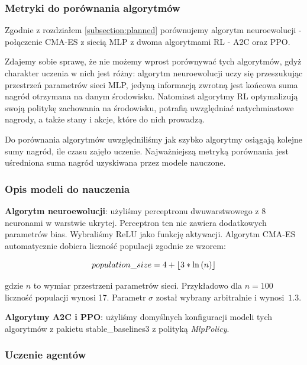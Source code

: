 \documentclass[12pt,a4paper]{article}
\DeclarePairedDelimiter\floor{\lfloor}{\rfloor}
\begin{document}
\subsubsection{Metryki do porównania algorytmów}

Zgodnie z rozdziałem \ref{subsection:planned} porównujemy
algorytm neuroewolucji - połączenie CMA-ES z siecią MLP z dwoma algorytmami
RL - A2C oraz PPO.

Zdajemy sobie sprawę, że nie możemy wprost porównywać tych algorytmów, gdyż
charakter uczenia w nich jest różny: algorytm neuroewolucji uczy się
przeszukując przestrzeń parametrów sieci MLP, jedyną informacją zwrotną jest
końcowa suma nagród otrzymana na danym środowisku. Natomiast algorytmy
RL optymalizują swoją politykę zachowania na środowisku, potrafią
uwzględniać natychmiastowe nagrody, a także stany i akcje, które do nich
prowadzą.

Do porównania algorytmów uwzględniliśmy jak szybko algorytmy osiągają
kolejne sumy nagród, ile czasu zajęło uczenie. Najważniejszą metryką
porównania jest uśredniona suma nagród uzyskiwana  przez modele nauczone.

\subsubsection{Opis modeli do nauczenia}

\textbf{Algorytm neuroewolucji}: użyliśmy perceptronu
dwuwarstwowego z 8 neuronami w warstwie ukrytej. Perceptron ten nie zawiera
dodatkowych parametrów bias. Wybraliśmy ReLU jako funkcję aktywacji.
Algorytm \mbox{CMA-ES} automatycznie dobiera liczność populacji zgodnie
ze wzorem:

\begin{equation*}
  population\_size = 4 + \floor{3 * \ln{(n)} }
\end{equation*}

gdzie $n$ to wymiar przestrzeni parametrów sieci. Przykładowo
dla $ n = 100 $ liczność populacji wynosi 17. Parametr $\sigma$
został wybrany arbitralnie i \mbox{wynosi $1.3$}.

\bigskip

\noindent\textbf{Algorytmy A2C i PPO}: użyliśmy domyślnych konfiguracji
modeli tych algorytmów z pakietu stable\_baselines3 z polityką
\emph{MlpPolicy}.

\subsubsection{Uczenie agentów}
\end{document}
